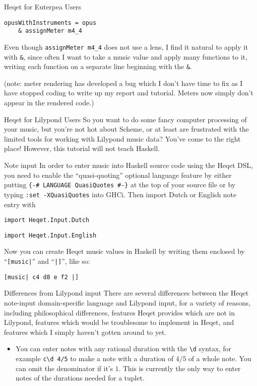 \documentclass{article}
\begin{document}
\begin{section}{Heqet for Euterpea Users}
\begin{verbatim}opusWithInstruments = opus 
    & assignMeter m4_4
\end{verbatim}

Even though \verb+assignMeter m4_4+ does not use a lens, I find it natural to apply it with \verb+&+, since often I want to take a music value and apply many functions to it, writing each function on a separate line beginning with the \verb+&+. 

(note: meter rendering has developed a bug which I don't have time to fix as I have stopped coding to write up my report and tutorial. Meters now simply don't appear in the rendered code.)

\end{section}

\begin{section}{Heqet for Lilypond Users}
So you want to do some fancy computer processing of your music, but you're not hot about Scheme, or at least are frustrated with the limited tools for working with Lilypond music data? You've come to the right place! However, this tutorial will not teach Haskell. 

\begin{subsection}{Note input}
In order to enter music into Haskell source code using the Heqet DSL, you need to enable the  ``quasi-quoting'' optional language feature by either putting \verb+{-# LANGUAGE QuasiQuotes #-}+ at the top of your source file or by typing \verb+:set -XQuasiQuotes+ into GHCi. Then import Dutch or English note entry with 

\verb+import Heqet.Input.Dutch+

\verb+import Heqet.Input.English+

Now you can create Heqet music values in Haskell by writing them enclosed by ``\verb+[music|+'' and ``\verb+|]+'', like so: 

\verb+[music| c4 d8 e f2 |]+

\end{subsection}

\begin{subsection}{Differences from Lilypond input}
There are several differences between the Heqet note-input domain-specific language and Lilypond input, for a variety of reasons, including philosophical differences, features Heqet provides which are not in Lilypond, features which would be troublesome to implement in Heqet, and features which I simply haven't gotten around to yet. 
\begin{itemize}
\item You can enter notes with any rational duration with the \verb+\d+ syntax, for example \verb+c\d 4/5+ to make a note with a duration of $4/5$ of a whole note. You can omit the denominator if it's $1$. This is currently the only way to enter notes of the durations needed for a tuplet.


\end{itemize}
\end{subsection}
\end{section}
\end{document}
